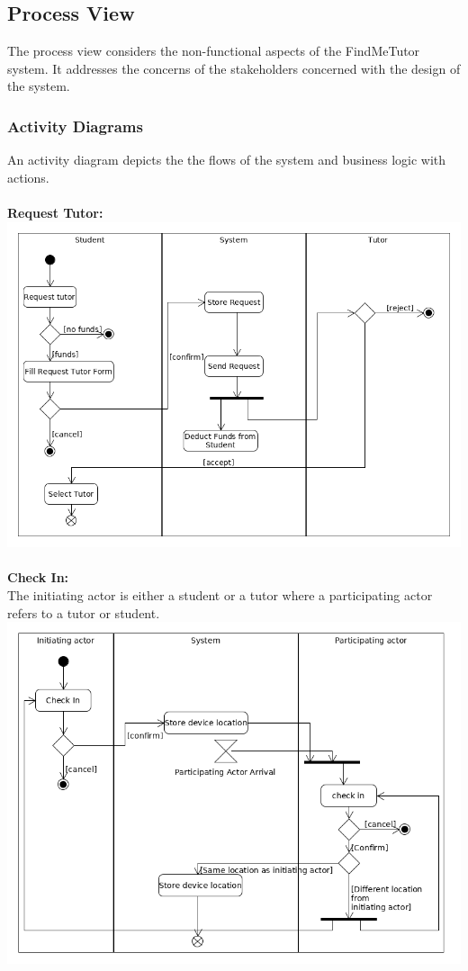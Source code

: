 \documentclass[12pt]{article}
\begin{document}
\newpage

\subsection{Process View}
The process view considers the non-functional aspects of the FindMeTutor system. It addresses the concerns of the stakeholders concerned with the design of the system.

\subsubsection{Activity Diagrams}
An activity diagram depicts the the flows of the system and business logic with actions.\\
\\\textbf{Request Tutor:}\\
\includegraphics[width=140mm]{./activity_diagram/request_tutor.png}
\pagebreak
\\\\\textbf{Check In:}\\
The initiating actor is either a student or a tutor where a participating actor refers to a tutor or student.\\
\includegraphics[width=140mm]{./activity_diagram/checked_in.png}
\end{document}
